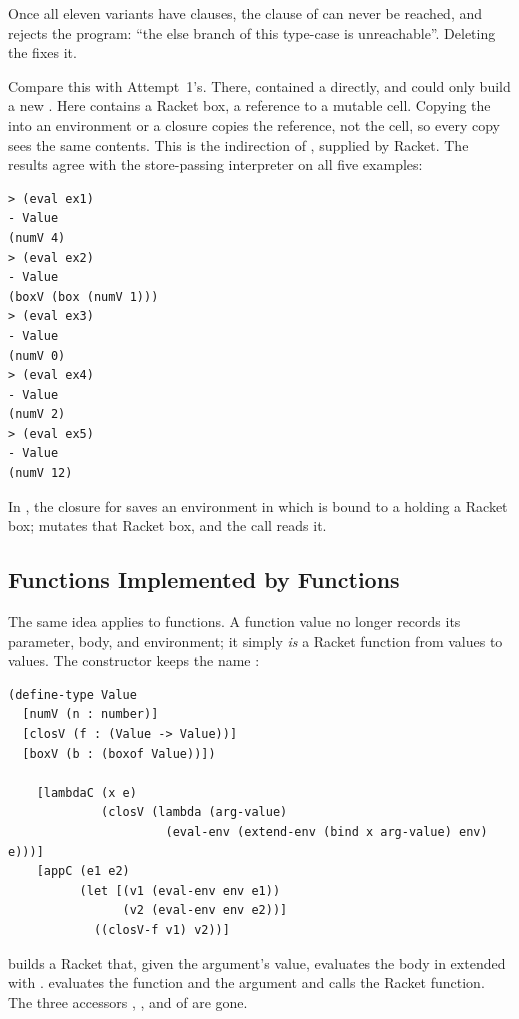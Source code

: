 \begin{remark}
Once all eleven variants have clauses, the  clause of  can never be reached, and  rejects the program: ``the else branch of this type-case is unreachable''. Deleting the  fixes it.
\end{remark}

Compare this  with Attempt~1's. There,  contained a  directly, and  could only build a new . Here  contains a Racket box, a reference to a mutable cell. Copying the  into an environment or a closure copies the reference, not the cell, so every copy sees the same contents. This is the indirection of , supplied by Racket. The results agree with the store-passing interpreter on all five examples:
\begin{lstlisting}[style=repl]
> (eval ex1)
- Value
(numV 4)
> (eval ex2)
- Value
(boxV (box (numV 1)))
> (eval ex3)
- Value
(numV 0)
> (eval ex4)
- Value
(numV 2)
> (eval ex5)
- Value
(numV 12)
\end{lstlisting}
In , the closure for  saves an environment in which  is bound to a  holding a Racket box;  mutates that Racket box, and the call reads it.

\subsection{Functions Implemented by Functions}

The same idea applies to functions. A function value no longer records its parameter, body, and environment; it simply \emph{is} a Racket function from values to values. The constructor keeps the name :
\begin{lstlisting}
(define-type Value
  [numV (n : number)]
  [closV (f : (Value -> Value))]
  [boxV (b : (boxof Value))])

    [lambdaC (x e)
             (closV (lambda (arg-value)
                      (eval-env (extend-env (bind x arg-value) env) e)))]
    [appC (e1 e2)
          (let [(v1 (eval-env env e1))
                (v2 (eval-env env e2))]
            ((closV-f v1) v2))]
\end{lstlisting}
 builds a Racket  that, given the argument's value, evaluates the body in  extended with .  evaluates the function and the argument and calls the Racket function. The three accessors , , and  of  are gone.

